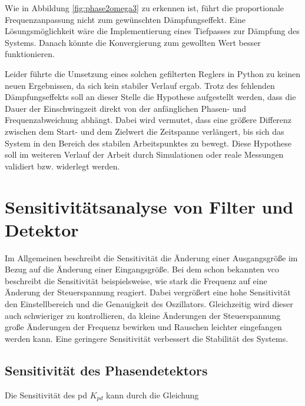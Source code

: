 \documentclass[../main.tex]{subfiles}
\begin{document}
Wie in Abbildung \ref{fig:phase2omega3} zu erkennen ist, führt die proportionale Frequenzanpassung nicht zum gewünschten Dämpfungseffekt. Eine Lösungsmöglichkeit wäre die Implementierung eines Tiefpasses zur Dämpfung des Systems. Danach könnte die Konvergierung zum gewollten Wert besser funktionieren. \cite{philippsenReg}\par
\medskip

Leider führte die Umsetzung eines solchen gefilterten Reglers in Python zu keinen neuen Ergebnissen, da sich kein stabiler Verlauf ergab. Trotz des fehlenden Dämpfungseffekts soll an dieser Stelle die Hypothese aufgestellt werden, dass die Dauer der Einschwingzeit direkt von der anfänglichen Phasen- und Frequenzabweichung abhängt. Dabei wird vermutet, dass eine größere Differenz zwischen dem Start- und dem Zielwert die Zeitspanne verlängert, bis sich das System in den Bereich des stabilen Arbeitspunktes zu bewegt. Diese Hypothese soll im weiteren Verlauf der Arbeit durch Simulationen oder reale Messungen validiert bzw. widerlegt werden.\par




\section{Sensitivitätsanalyse von Filter und Detektor}
Im Allgemeinen beschreibt die Sensitivität die Änderung einer Ausgangsgröße im Bezug auf die Änderung einer Eingangsgröße. Bei dem schon bekannten \gls{vco} beschreibt die Sensitivität beispielsweise, wie stark die Frequenz auf eine Änderung der Steuerspannung reagiert. Dabei vergrößert eine hohe Sensitivität den Einstellbereich und die Genauigkeit des Oszillators. Gleichzeitig wird dieser auch schwieriger zu kontrollieren, da kleine Änderungen der Steuerspannung große Änderungen der Frequenz bewirken und Rauschen leichter eingefangen werden kann. Eine geringere Sensitivität verbessert die Stabilität des Systems. \cite{sensi_vco}\par


\subsection{Sensitivität des Phasendetektors}
Die Sensitivität des \gls{pd} $K_{pd}$ kann durch die Gleichung 
\end{document}

